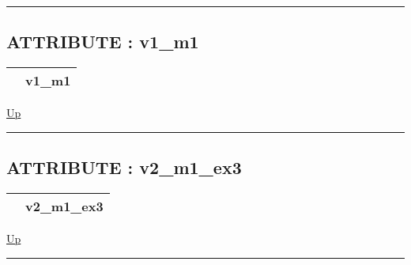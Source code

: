 \rule{\textwidth}{0.4pt}

\subsection*{ATTRIBUTE : v1\_m1}
\hypertarget{ecldoc:intest.example_3.mod_1.v1_m1}{}

{\renewcommand{\arraystretch}{1.5}
\begin{tabularx}{\textwidth}{|>{\raggedright\arraybackslash}l|X|}
\hline
\hspace{0pt} & v1\_m1 \\
\hline
\end{tabularx}
}

\hyperlink{ecldoc:intest.Example_3.mod_1}{Up}

\par


\rule{\textwidth}{0.4pt}
\subsection*{ATTRIBUTE : v2\_m1\_ex3}
\hypertarget{ecldoc:intest.example_3.mod_1.v2_m1_ex3}{}

{\renewcommand{\arraystretch}{1.5}
\begin{tabularx}{\textwidth}{|>{\raggedright\arraybackslash}l|X|}
\hline
\hspace{0pt} & v2\_m1\_ex3 \\
\hline
\end{tabularx}
}

\hyperlink{ecldoc:intest.Example_3.mod_1}{Up}

\par


\rule{\textwidth}{0.4pt}




